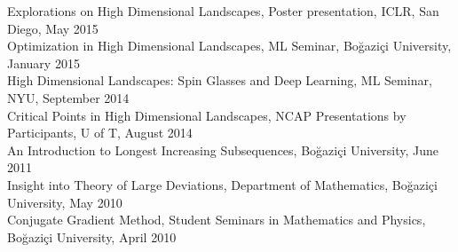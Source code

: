 \documentclass[10pt,letterpaper]{article}
\renewenvironment{itemize}
{
\begin{list}{}{\setlength{\leftmargin}{1.5em}}
}
{
  \end{list}
}
\begin{document}
\begin{itemize}
Explorations on High Dimensional Landscapes, Poster presentation, ICLR, San Diego, May 2015 \\ 
Optimization in High Dimensional Landscapes, ML Seminar, Bo\u{g}azi\c{c}i University, January 2015 \\ 
High Dimensional Landscapes: Spin Glasses and Deep Learning, ML Seminar, NYU, September 2014 \\ 
Critical Points in High Dimensional Landscapes, NCAP Presentations by Participants, U of T, August 2014 \\ 
An Introduction to Longest Increasing Subsequences, Bo\u{g}azi\c{c}i University, June 2011 \\ 
Insight into Theory of Large Deviations, Department of Mathematics, Bo\u{g}azi\c{c}i University, May 2010 \\ 
Conjugate Gradient Method, Student Seminars in Mathematics and Physics, Bo\u{g}azi\c{c}i University, April 2010
\end{itemize}


\end{document}
